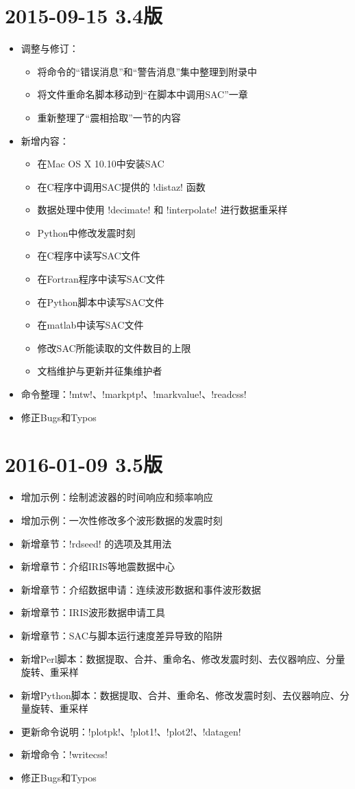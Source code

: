 \section*{2015-09-15 3.4版}
\begin{itemize}
\item 调整与修订：
    \begin{itemize}
    \item 将命令的``错误消息''和``警告消息''集中整理到附录中
    \item 将文件重命名脚本移动到``在脚本中调用SAC''一章
    \item 重新整理了``震相拾取''一节的内容
    \end{itemize}
\item 新增内容：
    \begin{itemize}
    \item 在Mac OS X 10.10中安装SAC
    \item 在C程序中调用SAC提供的 !distaz! 函数
    \item 数据处理中使用 !decimate! 和 !interpolate! 进行数据重采样
    \item Python中修改发震时刻
    \item 在C程序中读写SAC文件
    \item 在Fortran程序中读写SAC文件
    \item 在Python脚本中读写SAC文件
    \item 在matlab中读写SAC文件
    \item 修改SAC所能读取的文件数目的上限
    \item 文档维护与更新并征集维护者
    \end{itemize}
\item 命令整理：!mtw!、!markptp!、!markvalue!、!readcss!
\item 修正Bugs和Typos
\end{itemize}

\section*{2016-01-09 3.5版}
\begin{itemize}
\item 增加示例：绘制滤波器的时间响应和频率响应
\item 增加示例：一次性修改多个波形数据的发震时刻
\item 新增章节：!rdseed! 的选项及其用法
\item 新增章节：介绍IRIS等地震数据中心
\item 新增章节：介绍数据申请：连续波形数据和事件波形数据
\item 新增章节：IRIS波形数据申请工具
\item 新增章节：SAC与脚本运行速度差异导致的陷阱
\item 新增Perl脚本：数据提取、合并、重命名、修改发震时刻、去仪器响应、分量旋转、重采样
\item 新增Python脚本：数据提取、合并、重命名、修改发震时刻、去仪器响应、分量旋转、重采样
\item 更新命令说明：!plotpk!、!plot1!、!plot2!、!datagen!
\item 新增命令：!writecss!
\item 修正Bugs和Typos
\end{itemize}

